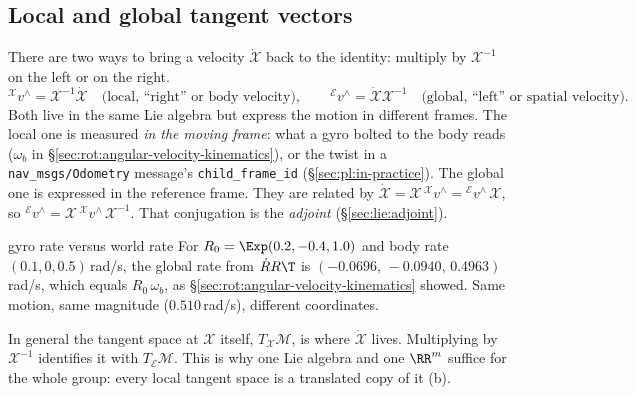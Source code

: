 \subsection{Local and global tangent vectors}\label{sec:lie:local-global}

There are two ways to bring a velocity $\dot{\mathcal X}$ back to the identity: multiply by $\mathcal X^{-1}$ on the left or on the right.
\[
{}^{\mathcal X}v^\wedge=\mathcal X^{-1}\dot{\mathcal X}\quad\text{(local, ``right'' or body velocity)},\qquad
{}^{\mathcal E}v^\wedge=\dot{\mathcal X}\mathcal X^{-1}\quad\text{(global, ``left'' or spatial velocity)}.
\]
Both live in the same Lie algebra but express the motion in different frames. The local one is measured \emph{in the moving frame}: what a gyro bolted to the body reads ($\omega_b$ in \S\ref{sec:rot:angular-velocity-kinematics}), or the twist in a \texttt{nav\_msgs/Odometry} message's \texttt{child\_frame\_id} (\S\ref{sec:pl:in-practice}). The global one is expressed in the reference frame. They are related by $\dot{\mathcal X}=\mathcal X\,{}^{\mathcal X}v^\wedge={}^{\mathcal E}v^\wedge\,\mathcal X$, so ${}^{\mathcal E}v^\wedge=\mathcal X\,{}^{\mathcal X}v^\wedge\,\mathcal X^{-1}$. That conjugation is the \emph{adjoint} (\S\ref{sec:lie:adjoint}).

\begin{example}{gyro rate versus world rate}
For $R_0=\Exp(0.2,-0.4,1.0)$ and body rate $(0.1,0,0.5)$\,rad/s, the global rate from $\dot RR\T$ is $(-0.0696,\,-0.0940,\,0.4963)$\,rad/s, which equals $R_0\,\omega_b$, as \S\ref{sec:rot:angular-velocity-kinematics} showed. Same motion, same magnitude ($0.510$\,rad/s), different coordinates.
\end{example}

In general the tangent space at $\mathcal X$ itself, $T_{\mathcal X}\mathcal M$, is where $\dot{\mathcal X}$ lives. Multiplying by $\mathcal X^{-1}$ identifies it with $T_{\mathcal E}\mathcal M$. This is why one Lie algebra and one $\RR^m$ suffice for the whole group: every local tangent space is a translated copy of it (b).
